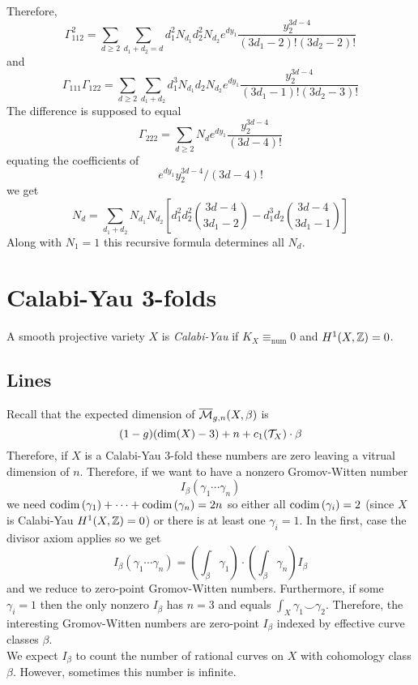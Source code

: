 \documentclass[12pt]{article}
\begin{document}
Therefore,
\[ \Gamma_{112}^2 = \sum_{d \ge 2} \sum_{d_1 + d_2 = d} d_1^2 N_{d_1} d_2^2 N_{d_2} e^{d y_1} \frac{y_2^{3d - 4}}{(3 d_1 - 2)! (3 d_2 - 2)!} \]
and
\[ \Gamma_{111} \Gamma_{122} = \sum_{d \ge 2} \sum_{d_1 + d_2} d_1^3 N_{d_1} d_2 N_{d_2} e^{d y_1} \frac{y_2^{3d - 4}}{(3 d_1 - 1)! (3 d_2 - 3)!} \]
The difference is supposed to equal
\[ \Gamma_{222} = \sum_{d \ge 2} N_d e^{d y_1} \frac{y_2^{3 d - 4}}{(3d - 4)!} \]
equating the coefficients of 
\[ e^{d y_1} y_2^{3d - 4} / (3d - 4)! \]
we get
\[ N_d = \sum_{d_1 + d_2} N_{d_1} N_{d_2} \left[ d_1^2 d_2^2 {3 d - 4 \choose 3 d_1 - 2} - d_1^3 d_2 {3 d - 4 \choose 3 d_1 - 1} \right] \]
Along with $N_1 = 1$ this recursive formula determines all $N_d$. 

\section{Calabi-Yau 3-folds}

\begin{defn}
A smooth projective variety $X$ is \textit{Calabi-Yau} if $K_X \equiv_{\text{num}} 0$ and $H^1(X, \mathbb{Z}) = 0$.
\end{defn}

\subsection{Lines}

Recall that the expected dimension of $\overline{\mathcal{M}}_{g,n}(X, \beta)$ is 
\[ (1 - g)(\dim(X) - 3) + n + c_1(\mathcal{T}_X) \cdot \beta \]
Therefore, if $X$ is a Calabi-Yau $3$-fold these numbers are zero leaving a vitrual dimension of $n$. Therefore, if we want to have a nonzero Gromov-Witten number
\[ I_\beta(\gamma_1 \cdots \gamma_n) \]
we need $\mathrm{codim}\left( \gamma_1 \right) + \cdots + \mathrm{codim}\left( \gamma_n \right) = 2n$ so either all $\mathrm{codim}\left( \gamma_i \right) = 2$ (since $X$ is Calabi-Yau $H^1(X, \mathbb{Z}) = 0$) or there is at least one $\gamma_i = 1$. In the first, case the divisor axiom applies so we get
\[ I_\beta(\gamma_1 \cdots \gamma_n) = \left( \int_\beta \gamma_1 \right) \cdot \left( \int_\beta \gamma_n \right) I_\beta \]
and we reduce to zero-point Gromov-Witten numbers. Furthermore, if some $\gamma_i = 1$ then the only nonzero $I_\beta$ has $n = 3$ and equals $\int_X \gamma_1 \smile \gamma_2$. Therefore, the interesting Gromov-Witten numbers are zero-point $I_\beta$ indexed by effective curve classes $\beta$.
\bigskip\\
We expect $I_\beta$ to count the number of rational curves on $X$ with cohomology class $\beta$. However, sometimes this number is infinite. 
\end{document}
